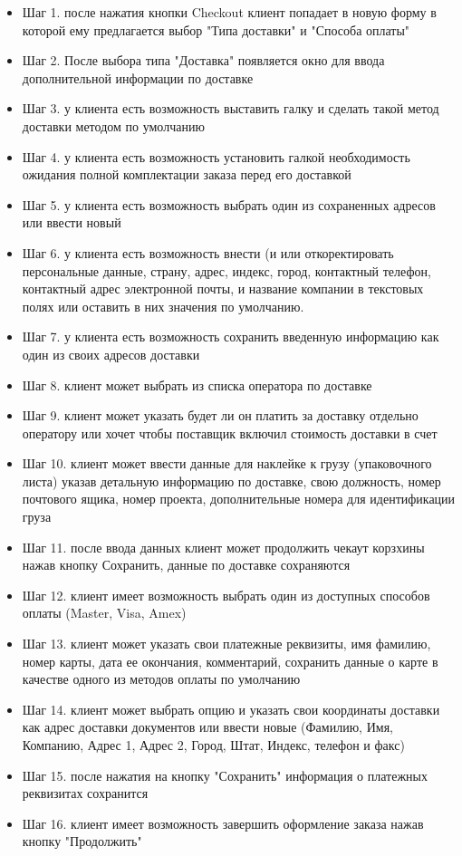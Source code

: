 {


\begin{wikilong}
\begin{itemize}
	\item Шаг 1. после нажатия кнопки Checkout клиент попадает в новую форму в которой ему предлагается выбор "Типа доставки" и "Способа оплаты"
	\item Шаг 2. После выбора типа "Доставка" появляется окно для ввода дополнительной информации по доставке
	\item Шаг 3. у клиента есть возможность выставить галку и сделать такой метод доставки методом по умолчанию
	\item Шаг 4. у клиента есть возможность установить галкой необходимость ожидания полной комплектации заказа перед его доставкой
	\item Шаг 5. у клиента есть возможность выбрать один из сохраненных адресов или ввести новый
	\item Шаг 6. у клиента есть возможность внести (и или откоректировать персональные данные, страну, адрес, индекс, город, контактный телефон, контактный адрес электронной почты, и название компании в текстовых полях или оставить в них значения по умолчанию.
	\item Шаг 7. у клиента есть возможность сохранить введенную информацию как один из своих адресов доставки
	\item Шаг 8. клиент может выбрать из списка оператора по доставке
	\item Шаг 9. клиент может указать будет ли он платить за доставку отдельно оператору или хочет чтобы поставщик включил стоимость доставки в счет
	\item Шаг 10. клиент может ввести данные для наклейке к грузу (упаковочного листа) указав детальную информацию по доставке, свою должность, номер почтового ящика, номер проекта, дополнительные номера для идентификации груза
	\item Шаг 11. после ввода данных клиент может продолжить чекаут корзхины нажав кнопку Сохранить, данные по доставке сохраняются
	\item Шаг 12. клиент имеет возможность выбрать один из доступных способов оплаты (Master, Visa, Amex)
	\item Шаг 13. клиент может указать свои платежные реквизиты, имя фамилию, номер карты, дата ее окончания, комментарий, сохранить данные о карте в качестве одного из методов оплаты по умолчанию
	\item Шаг 14. клиент может выбрать опцию и указать свои координаты доставки как адрес доставки документов или ввести новые (Фамилию, Имя, Компанию, Адрес 1, Адрес 2, Город, Штат, Индекс, телефон и факс)
	\item Шаг 15. после нажатия на кнопку "Сохранить" информация о платежных реквизитах сохранится
	\item Шаг 16. клиент имеет возможность завершить оформление заказа нажав кнопку "Продолжить"
\end{itemize}


\end{wikilong}}
